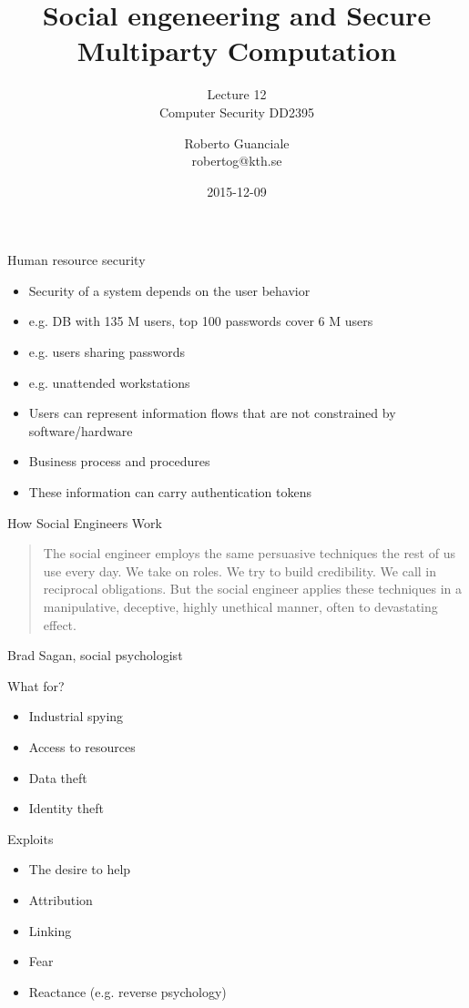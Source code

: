 \documentclass{beamer}
\title{Social engeneering and Secure Multiparty Computation}
\subtitle{Lecture 12 \\ Computer Security DD2395}
\author[R. Guanciale]{
  Roberto Guanciale\\
  robertog@kth.se
}
\date{2015-12-09}
\begin{document}
\begin{frame}[plain]
  \titlepage
\end{frame}

\begin{frame}{Human resource security}
  \begin{itemize}
    \item Security of a system depends on the user behavior
    \item e.g. DB with 135 M users, top 100 passwords cover 6 M users
    \item e.g. users sharing passwords
    \item e.g. unattended workstations
    \item Users can represent information flows that are not
      constrained by software/hardware
    \item Business process and procedures
    \item These information can carry authentication tokens
  \end{itemize}
\end{frame}


\begin{frame}{How Social Engineers Work}
  
  \begin{quote}
The social engineer employs the same persuasive 
techniques the rest of us use every day. We take 
on roles. We try to build credibility. We call in 
reciprocal obligations. But the social engineer 
applies these techniques in a manipulative, 
deceptive, highly unethical manner, often to 
devastating effect.
  \end{quote}
Brad Sagan, social psychologist
\end{frame}

\begin{frame}{What for?}
  \begin{itemize}
    \item Industrial spying 
    \item Access to resources 
    \item Data theft
    \item Identity theft
  \end{itemize}
\end{frame}
 

\begin{frame}{Exploits}
  \begin{itemize}
    \item The desire to help 
    \item Attribution
    \item Linking
    \item Fear
    \item Reactance (e.g. reverse psychology)
  \end{itemize}
\end{frame}
\end{document}
